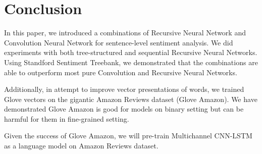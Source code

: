 \section{Conclusion}
In this paper, we introduced a combinations of Recursive Neural Network and Convolution Neural Network for sentence-level sentiment analysis.
We did experiments with both tree-structured and sequential Recursive Neural Networks.
Using Standford Sentiment Treebank, we demonstrated that the combinations are able to outperform most pure Convolution and Recursive Neural Networks.

Additionally, in attempt to improve vector presentations of words, we trained Glove vectors on the gigantic Amazon Reviews dataset (Glove Amazon).
We have demonstrated Glove Amazon is good for models on binary setting but can be harmful for them in fine-grained setting.

Given the success of Glove Amazon, we will pre-train Multichannel CNN-LSTM as a language model on Amazon Reviews dataset.

